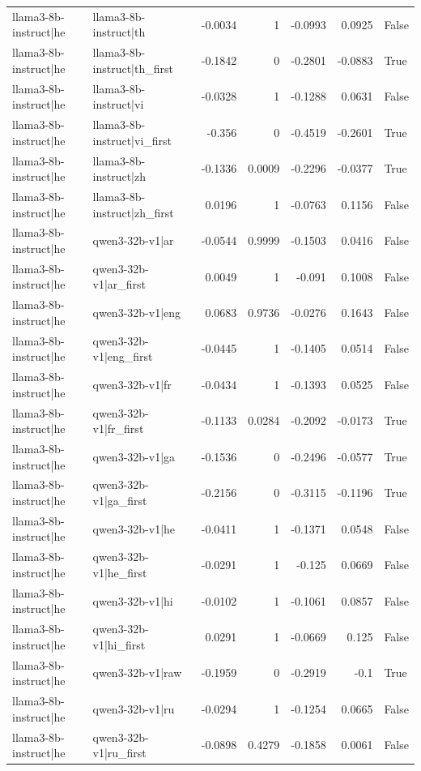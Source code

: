 \begin{table}
\begin{tabular}{l l r r r r l}
llama3-8b-instruct|he & llama3-8b-instruct|th & -0.0034 & 1 & -0.0993 & 0.0925 & False \\
llama3-8b-instruct|he & llama3-8b-instruct|th_first & -0.1842 & 0 & -0.2801 & -0.0883 & True \\
llama3-8b-instruct|he & llama3-8b-instruct|vi & -0.0328 & 1 & -0.1288 & 0.0631 & False \\
llama3-8b-instruct|he & llama3-8b-instruct|vi_first & -0.356 & 0 & -0.4519 & -0.2601 & True \\
llama3-8b-instruct|he & llama3-8b-instruct|zh & -0.1336 & 0.0009 & -0.2296 & -0.0377 & True \\
llama3-8b-instruct|he & llama3-8b-instruct|zh_first & 0.0196 & 1 & -0.0763 & 0.1156 & False \\
llama3-8b-instruct|he & qwen3-32b-v1|ar & -0.0544 & 0.9999 & -0.1503 & 0.0416 & False \\
llama3-8b-instruct|he & qwen3-32b-v1|ar_first & 0.0049 & 1 & -0.091 & 0.1008 & False \\
llama3-8b-instruct|he & qwen3-32b-v1|eng & 0.0683 & 0.9736 & -0.0276 & 0.1643 & False \\
llama3-8b-instruct|he & qwen3-32b-v1|eng_first & -0.0445 & 1 & -0.1405 & 0.0514 & False \\
llama3-8b-instruct|he & qwen3-32b-v1|fr & -0.0434 & 1 & -0.1393 & 0.0525 & False \\
llama3-8b-instruct|he & qwen3-32b-v1|fr_first & -0.1133 & 0.0284 & -0.2092 & -0.0173 & True \\
llama3-8b-instruct|he & qwen3-32b-v1|ga & -0.1536 & 0 & -0.2496 & -0.0577 & True \\
llama3-8b-instruct|he & qwen3-32b-v1|ga_first & -0.2156 & 0 & -0.3115 & -0.1196 & True \\
llama3-8b-instruct|he & qwen3-32b-v1|he & -0.0411 & 1 & -0.1371 & 0.0548 & False \\
llama3-8b-instruct|he & qwen3-32b-v1|he_first & -0.0291 & 1 & -0.125 & 0.0669 & False \\
llama3-8b-instruct|he & qwen3-32b-v1|hi & -0.0102 & 1 & -0.1061 & 0.0857 & False \\
llama3-8b-instruct|he & qwen3-32b-v1|hi_first & 0.0291 & 1 & -0.0669 & 0.125 & False \\
llama3-8b-instruct|he & qwen3-32b-v1|raw & -0.1959 & 0 & -0.2919 & -0.1 & True \\
llama3-8b-instruct|he & qwen3-32b-v1|ru & -0.0294 & 1 & -0.1254 & 0.0665 & False \\
llama3-8b-instruct|he & qwen3-32b-v1|ru_first & -0.0898 & 0.4279 & -0.1858 & 0.0061 & False \\

\end{tabular}
\end{table}

